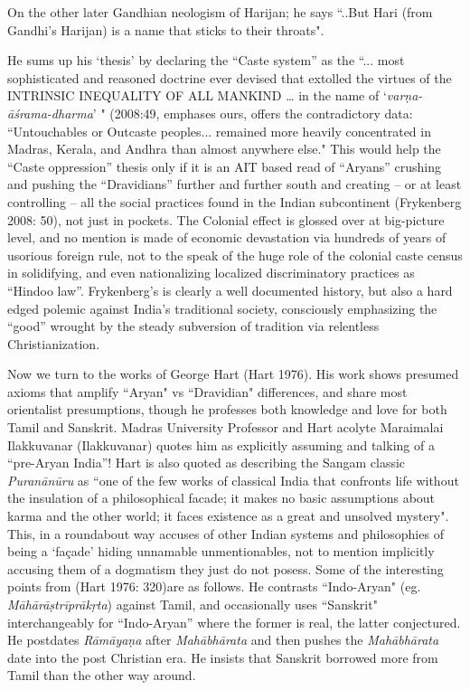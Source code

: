 On the other later Gandhian neologism of Harijan; he says “..But Hari (from Gandhi’s Harijan) is a name that sticks to their throats".

He sums up his ‘thesis’ by declaring the “Caste system” as the “... most sophisticated and reasoned doctrine ever devised that extolled the virtues of the INTRINSIC INEQUALITY OF ALL MANKIND … in the name of ‘\textit{varṇa-āśrama-dharma}’ " (2008:49, emphases ours, offers the contradictory data: “Untouchables or Outcaste peoples... remained more heavily concentrated in Madras, Kerala, and Andhra than almost anywhere else." This would help the “Caste oppression” thesis only if it is an AIT based read of “Aryans” crushing and pushing the “Dravidians” further and further south and creating – or at least controlling – all the social practices found in the Indian subcontinent (Frykenberg 2008: 50), not just in pockets. The Colonial effect is glossed over at big-picture level, and no mention is made of economic devastation via hundreds of years of usorious foreign rule, not to the speak of the huge role of the colonial caste census in solidifying, and even nationalizing localized discriminatory practices as “Hindoo law”. Frykenberg’s is clearly a well documented history, but also a hard edged polemic against India’s traditional society, consciously emphasizing the “good” wrought by the steady subversion of tradition via relentless Christianization.

Now we turn to the works of George Hart (Hart 1976). His work shows presumed axioms that amplify “Aryan" vs “Dravidian" differences, and share most orientalist presumptions, though he professes both knowledge and love for both Tamil and Sanskrit. Madras University Professor and Hart acolyte Maraimalai Ilakkuvanar (Ilakkuvanar) quotes him as explicitly assuming and talking of a “pre-Aryan India”! Hart is also quoted as describing the Sangam classic \textit{Puranānūru} as “one of the few works of classical India that confronts life without the insulation of a philosophical facade; it makes no basic assumptions about karma and the other world; it faces existence as a great and unsolved mystery". This, in a roundabout way accuses of other Indian systems and philosophies of being a ‘façade’ hiding unnamable unmentionables, not to mention implicitly accusing them of a dogmatism they just do not posess. Some of the interesting points from (Hart 1976: 320)are as follows. He contrasts “Indo-Aryan" (eg. \textit{Māhārāṣtrīprākṛta}) against Tamil, and occasionally uses “Sanskrit" interchangeably for “Indo-Aryan” where the former is real, the latter conjectured. He postdates \textit{Rāmāyaṇa} after \textit{Mahābhārata} and then pushes the \textit{Mahābhārata} date into the post Christian era. He insists that Sanskrit borrowed more from Tamil than the other way around.


